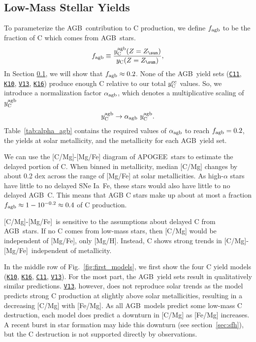 \documentclass[fleqn,
usenatbib]{mnras}
\newcommand{\cxi}{\texttt{\hyperlink{C11}{C11}}}
\newcommand{\kx}{\texttt{\hyperlink{K10}{K10}}}
\newcommand{\kxvi}{\texttt{\hyperlink{K16}{K16}}}
\newcommand{\vxiii}{\texttt{\hyperlink{V13}{V13}}}
\newcommand{\agb}{AGB}
\newcommand{\apogee}{APOGEE}
\newcommand{\ia}{SNe Ia}
\newcommand{\caafe}{[C/Mg]-[Mg/Fe]}
\newcommand{\Yct}{\ensuremath{y_{\rm C}}}
\newcommand{\Ycc}{\ensuremath{y_{\rm C}^{\rm cc}}}
\newcommand{\Ycagb}{\ensuremath{y_{\rm C}^{\rm agb}}}
\newcommand{\Zo}{%
    \ifmmode Z_{\sun}%
    \else $Z_{\sun}$%
    \fi}
\begin{document}
\subsection{Low-Mass Stellar Yields}\label{sec:agb_results}


To parameterize the \agb\ contribution to C production, we define $f_{\rm agb}$ to be the fraction of C which comes from \agb\ stars. 
\begin{equation}\label{eq:f_agb}
    f_{\rm agb} \equiv \frac{\Ycagb(Z=\Zo)}{\Yct(Z=\Zo)},
\end{equation}
In Section \ref{sec:agb_results}, we will show that $f_{\rm agb} \approx 0.2$. 
None of the \agb\ yield sets (\cxi{}, \kx{}, \vxiii{}, \kxvi{}) produce enough C relative to our total $\Ycc$ values. So, we introduce a normalization factor $\alpha_{\rm agb}$, which denotes a multiplicative scaling of $\Ycagb$ 
\begin{equation} \label{eq:alpha}
        \Ycagb \rightarrow \alpha_{\rm agb}\ \Ycagb.
\end{equation}
Table~\ref{tab:alpha_agb} contains the required values of $\alpha_{\rm agb}$ to reach $f_{\rm agb}=0.2$, the yields at solar metallicity, and the metallicity for each \agb\ yield set. 

We can use the \caafe{} diagram of \apogee\ stars to estimate the delayed portion of C. When binned in metallicity, median [C/Mg] changes by about 0.2 dex across the range of [Mg/Fe] at solar metallicities. As high-$\alpha$ stars have little to no delayed \ia\ Fe, these stars would also have little to no delayed \agb\ C. This means that AGB C stars make up about at most a fraction $f_{\rm agb} \approx 1 - 10^{-0.2} \approx 0.4$ of C production.

\caafe\ is sensitive to the assumptions about delayed C from \agb\ stars. If no C comes from low-mass stars, then [C/Mg] would be independent of [Mg/Fe], only [Mg/H]. Instead, C shows strong trends  in \caafe\, independent of metallicity. 

In the middle row of Fig.~\ref{fig:first_models}, we first show the four C yield models (\kx, \kxvi, \cxi, \vxiii). For the most part, the \agb\ yield sets result in qualitatively similar predictions. \vxiii, however, does not reproduce solar trends as the model predicts strong C production at slightly above solar metallicities, resulting in a decreasing [C/Mg] with [Fe/Mg]. 
As all \agb\ models predict some low-mass C destruction, each model does predict a downturn in [C/Mg] as [Fe/Mg] increases. A recent burst in star formation may hide this downturn (see section~\ref{sec:sfh}), but the C destruction is not supported directly by observations. 
\end{document}
